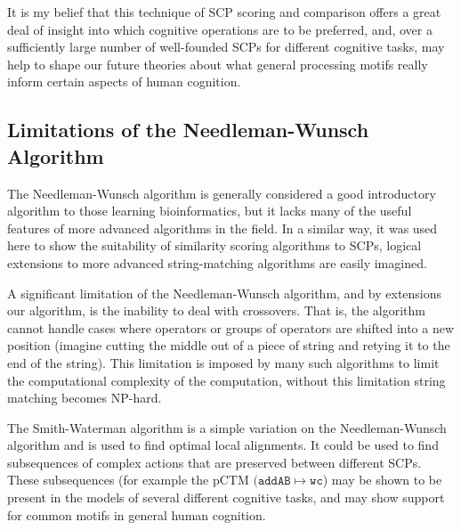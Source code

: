 It is my belief that this technique of SCP scoring and comparison offers a great deal of insight into which cognitive operations are to be preferred, and, over a sufficiently large number of well-founded SCPs for different cognitive tasks, may help to shape our future theories about what general processing motifs really inform certain aspects of human cognition.

\subsection{Limitations of the Needleman-Wunsch Algorithm}

The Needleman-Wunsch algorithm is generally considered a good introductory algorithm to those learning bioinformatics, but it lacks many of the useful features of more advanced algorithms in the field. In a similar way, it was used here to show the suitability of similarity scoring algorithms to SCPs, logical extensions to more advanced string-matching algorithms are easily imagined.

A significant limitation of the Needleman-Wunsch algorithm, and by extensions our algorithm, is the inability to deal with crossovers. That is, the algorithm cannot handle cases where operators or groups of operators are shifted into a new position (imagine cutting the middle out of a piece of string and retying it to the end of the string). This limitation is imposed by many such algorithms to limit the computational complexity of the computation, without this limitation string matching becomes NP-hard.

The Smith-Waterman algorithm \citep{smith1981identification} is a simple variation on the Needleman-Wunsch algorithm and is used to  find optimal local alignments. It could be used to find subsequences of complex actions that are preserved between different SCPs. These subsequences (for example the pCTM $(\texttt{addAB} \longmapsto \texttt{wc}$) may be shown to be present in the models of several different cognitive tasks, and may show support for common motifs in general human cognition.

